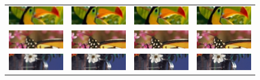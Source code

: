\documentclass[10pt,twocolumn,letterpaper]{article}
\begin{document}
\begin{figure}
{\begin{tabular}{cccc}
\includegraphics[width=0.075\linewidth]{bird_GTOx4}&
\includegraphics[width=0.3\linewidth]{bird_GTZx4}&
\includegraphics[width=0.3\linewidth]{bird_GTA+x4}&
\includegraphics[width=0.3\linewidth]{bird_GTIx4}\\
\includegraphics[width=0.075\linewidth]{monarchOx4}&
\includegraphics[width=0.3\linewidth]{monarchZx4}&
\includegraphics[width=0.3\linewidth]{monarchA+x4}&
\includegraphics[width=0.3\linewidth]{monarchIx4}\\
\includegraphics[width=0.075\linewidth]{flowersO2x4}&
\includegraphics[width=0.3\linewidth]{flowersZ2x4}&
\includegraphics[width=0.3\linewidth]{flowersA+2x4}&
\includegraphics[width=0.3\linewidth]{flowersI2x4}\\

\end{tabular}}
\end{figure}
\end{document}
